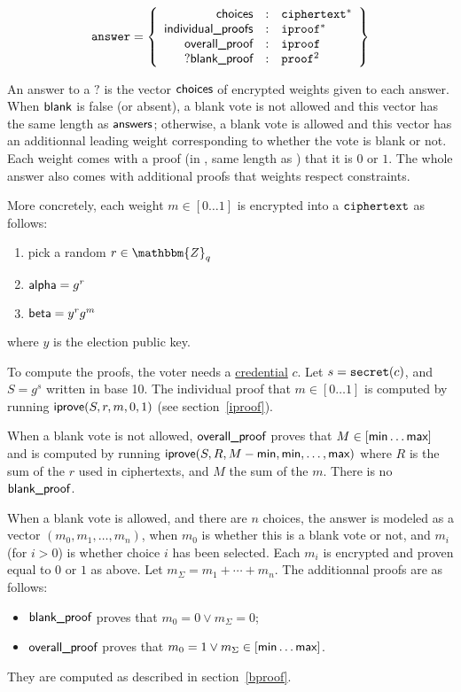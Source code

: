 \documentclass[a4paper]{article}
\newcommand{\Z}{\mathbbm{Z}}
\begin{document}
\begin{gather*}
  \texttt{answer}=\left\{
    \begin{array}{rcl}
      \textsf{choices}&:&\texttt{ciphertext}^\ast\\
      \textsf{individual\_proofs}&:&\texttt{iproof}^\ast\\
      \textsf{overall\_proof}&:&\texttt{iproof}\\
      ?\textsf{blank\_proof}&:&\texttt{proof}^2
    \end{array}
  \right\}
\end{gather*}

An answer to a \hyperref[elections]{$\question$} is the vector
$\textsf{choices}$ of encrypted weights given to each answer. When $\textsf{blank}$ is
false (or absent), a blank vote is not allowed and this vector has the
same length as $\textsf{answers}$; otherwise, a blank vote is allowed and this
vector has an additionnal leading weight corresponding to whether the
vote is blank or not.  Each weight comes with a proof (in \iproofs,
same length as \choices) that it is $0$ or $1$. The whole answer also
comes with additional proofs that weights respect constraints.

More concretely, each weight $m\in[0\dots1]$ is encrypted into a
$\texttt{ciphertext}$ as follows:
\begin{enumerate}
\item pick a random $r\in\Z_q$
\item $\textsf{alpha}=g^r$
\item $\textsf{beta}=y^rg^m$
\end{enumerate}
where $y$ is the election public key.

To compute the proofs, the voter needs a
\hyperref[credentials]{credential} $c$. Let $s=\texttt{secret}(c)$, and
$S=g^s$ written in base 10. The individual proof that $m\in[0\dots1]$
is computed by running $\textsf{iprove}(S,r,m,0,1)$ (see
section~\ref{iproof}).

When a blank vote is not allowed, $\textsf{overall\_proof}$ proves that
$M\in[\textsf{min}\dots\textsf{max}]$ and is computed by running
$\textsf{iprove}(S,R,M-\textsf{min},\textsf{min},\dots,\textsf{max})$ where $R$ is the
sum of the $r$ used in ciphertexts, and $M$ the sum of the $m$. There
is no $\textsf{blank\_proof}$.

When a blank vote is allowed, and there are $n$ choices, the answer is
modeled as a vector $(m_0,m_1,\dotsc,m_n)$, when $m_0$ is whether this
is a blank vote or not, and $m_i$ (for $i>0$) is whether choice $i$
has been selected. Each $m_i$ is encrypted and proven equal to $0$ or
$1$ as above. Let $m_\Sigma=m_1+\dotsb+m_n$. The additionnal proofs
are as follows:
\begin{itemize}
\item $\textsf{blank\_proof}$ proves that $m_0=0\lor m_\Sigma=0$;
\item $\textsf{overall\_proof}$ proves that $m_0=1\lor m_\Sigma\in[\textsf{min}\dots\textsf{max}]$.
\end{itemize}
They are computed as described in section~\ref{bproof}.
\end{document}
